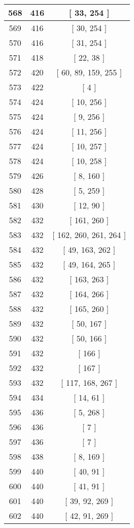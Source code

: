 \begin{center}
\begin{longtable}[H]{|| c c c ||}
\hline
568 & 416 & [ 33, 254 ] \\ 
\hline
569 & 416 & [ 30, 254 ] \\ 
\hline
570 & 416 & [ 31, 254 ] \\ 
\hline
571 & 418 & [ 22, 38 ] \\ 
\hline
572 & 420 & [ 60, 89, 159, 255 ] \\ 
\hline
573 & 422 & [ 4 ] \\ 
\hline
574 & 424 & [ 10, 256 ] \\ 
\hline
575 & 424 & [ 9, 256 ] \\ 
\hline
576 & 424 & [ 11, 256 ] \\ 
\hline
577 & 424 & [ 10, 257 ] \\ 
\hline
578 & 424 & [ 10, 258 ] \\ 
\hline
579 & 426 & [ 8, 160 ] \\ 
\hline
580 & 428 & [ 5, 259 ] \\ 
\hline
581 & 430 & [ 12, 90 ] \\ 
\hline
582 & 432 & [ 161, 260 ] \\ 
\hline
583 & 432 & [ 162, 260, 261, 264 ] \\ 
\hline
584 & 432 & [ 49, 163, 262 ] \\ 
\hline
585 & 432 & [ 49, 164, 265 ] \\ 
\hline
586 & 432 & [ 163, 263 ] \\ 
\hline
587 & 432 & [ 164, 266 ] \\ 
\hline
588 & 432 & [ 165, 260 ] \\ 
\hline
589 & 432 & [ 50, 167 ] \\ 
\hline
590 & 432 & [ 50, 166 ] \\ 
\hline
591 & 432 & [ 166 ] \\ 
\hline
592 & 432 & [ 167 ] \\ 
\hline
593 & 432 & [ 117, 168, 267 ] \\ 
\hline
594 & 434 & [ 14, 61 ] \\ 
\hline
595 & 436 & [ 5, 268 ] \\ 
\hline
596 & 436 & [ 7 ] \\ 
\hline
597 & 436 & [ 7 ] \\ 
\hline
598 & 438 & [ 8, 169 ] \\ 
\hline
599 & 440 & [ 40, 91 ] \\ 
\hline
600 & 440 & [ 41, 91 ] \\ 
\hline
601 & 440 & [ 39, 92, 269 ] \\ 
\hline
602 & 440 & [ 42, 91, 269 ] \\ 

\end{longtable}
\end{center}
